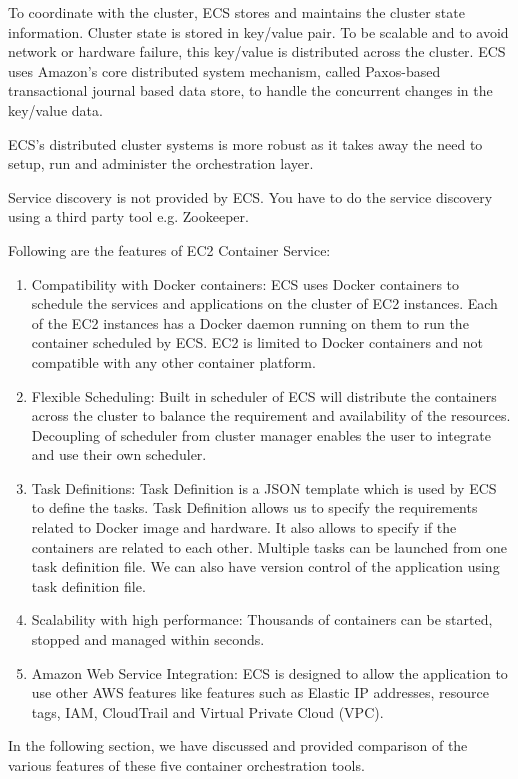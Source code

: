To coordinate with the cluster, ECS stores and maintains the cluster state information. Cluster state is stored in key/value pair. To be scalable and to avoid network or hardware failure, this key/value is distributed across the cluster. ECS uses Amazon’s core distributed system mechanism, called Paxos-based transactional journal based data store, to handle the concurrent changes in the key/value data.

ECS’s distributed cluster systems is more robust as it takes away the need to setup, run and administer the orchestration layer. 

Service discovery is not provided by ECS. You have to do the service discovery using a third party tool e.g. Zookeeper.

Following are the features of EC2 Container Service:

\begin{enumerate}
\item Compatibility with Docker containers:
ECS uses Docker containers to schedule the services and applications on the cluster of EC2 instances. Each of the EC2 instances has a Docker daemon running on them to run the container scheduled by ECS. EC2 is limited to Docker containers and not compatible with any other container platform.

\item Flexible Scheduling:
Built in scheduler of ECS will distribute the containers across the cluster to balance the requirement and availability of the resources. Decoupling of scheduler from cluster manager enables the user to integrate and use their own scheduler.

\item Task Definitions:
Task Definition is a JSON template which is used by ECS to define the tasks. Task Definition allows us to specify the requirements related to Docker image and hardware. It also allows to specify if the containers are related to each other. Multiple tasks can be launched from one task definition file. We can also have version control of the application using task definition file.

\item Scalability with high performance:
Thousands of containers can be started, stopped and managed within seconds.

\item Amazon Web Service Integration:
ECS is designed to allow the application to use other AWS features like features such as Elastic IP addresses, resource tags, IAM, CloudTrail and Virtual Private Cloud (VPC).

\end{enumerate}

In the following section, we have discussed and provided comparison of the various features of these five container orchestration tools.